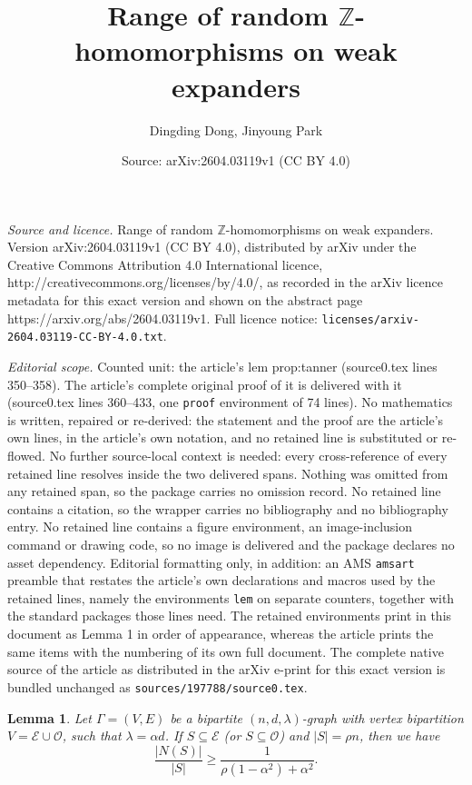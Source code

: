 \documentclass[10pt,a4paper]{amsart}
\title{Range of random $\mathbb Z$-homomorphisms on weak expanders}
\author{Dingding Dong, Jinyoung Park}
\date{Source: arXiv:2604.03119v1 (CC BY 4.0)}
\newtheorem{lem}{Lemma}
\newcommand{\cE}{\mathcal{E} }
\newcommand{\cO}{\mathcal{O} }
\begin{document}
\maketitle

\noindent\emph{Source and licence.} Range of random $\mathbb Z$-homomorphisms on weak expanders. Version arXiv:2604.03119v1 (CC BY 4.0), distributed by arXiv under the Creative Commons Attribution 4.0 International licence, http://creativecommons.org/licenses/by/4.0/, as recorded in the arXiv licence metadata for this exact version and shown on the abstract page https://arxiv.org/abs/2604.03119v1. Full licence notice: \texttt{licenses/arxiv-2604.03119-CC-BY-4.0.txt}.\par\smallskip

\noindent\textit{Editorial scope.} Counted unit: the article's lem prop:tanner (source0.tex lines 350--358). The article's complete original proof of it is delivered with it (source0.tex lines 360--433, one \texttt{proof} environment of 74 lines). No mathematics is written, repaired or re-derived: the statement and the proof are the article's own lines, in the article's own notation, and no retained line is substituted or re-flowed.  No further source-local context is needed: every cross-reference of every retained line resolves inside the two delivered spans.  Nothing was omitted from any retained span, so the package carries no omission record.  No retained line contains a citation, so the wrapper carries no bibliography and no bibliography entry.  No retained line contains a figure environment, an image-inclusion command or drawing code, so no image is delivered and the package declares no asset dependency.  Editorial formatting only, in addition: an AMS \texttt{amsart} preamble that restates the article's own declarations and macros used by the retained lines, namely the environments \texttt{lem} on separate counters, together with the standard packages those lines need.  The retained environments print in this document as Lemma 1 in order of appearance, whereas the article prints the same items with the numbering of its own full document.  The complete native source of the article as distributed in the arXiv e-print for this exact version is bundled unchanged as \texttt{sources/197788/source0.tex}.
\begin{lem}\label{prop:tanner}
Let $\Gamma=(V,E)$ be a bipartite $(n,d,\lambda)$-graph with vertex bipartition $V=\cE\cup \cO$, such that $\lambda=\alpha d$.
If $S\subseteq \cE$ (or $S\subseteq \cO$) and $|S|=\rho n$, then we have
\[
\frac{|N(S)|}{|S|}
\ge
\frac{1}{\rho(1-\alpha^2)+\alpha^2}.
\]
\end{lem}
\end{document}

